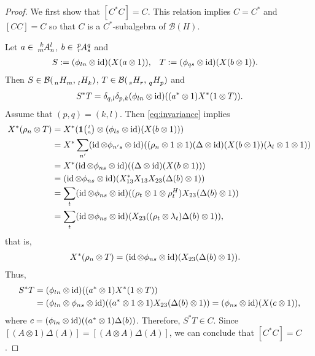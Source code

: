   \begin{proof}
We first show that $[C^{*}C]= C$. This relation implies $C=C^{*}$ and
$[CC]=C$ so that $C$ is a $C^{*}$-subalgebra of $\mathcal{B}(H)$. 

 Let $a\in \Gr{A}{k}{l}{m}{n}$, $b\in \Gr{A}{p}{q}{r}{s}$ and
 \begin{align*}
   S&:=(\phi_{ln} \otimes \operatorname{id})(X(a\otimes 1)), &
   T&:=(\phi_{qs} \otimes \operatorname{id})(X(b\otimes 1)).
 \end{align*}
Then  $S \in \mathcal{B}(\Grd{H}{n}{m},\Grd{H}{l}{k})$, $T\in
\mathcal{B}(\Grd{H}{s}{r},\Grd{H}{q}{p})$ and
\begin{align*}
  S^{*}T = \delta_{q,l}\delta_{p,k} (\phi_{ln} \otimes \operatorname{id})((a^{*}\otimes
  1)X^{*}(1\otimes T)).
\end{align*}
Assume that $(p,q)=(k,l)$.  Then \eqref{eq:invariance} implies
\begin{align*}
 X^{*}(\rho_{n}\otimes T) &=  X^{*}(\mathbf{1}{\tiny {\begin{pmatrix} l\\n\end{pmatrix}}} \otimes (\phi_{ls} \otimes
  \operatorname{id})(X(b\otimes 1))) \\
  &=  X^{*} \sum_{n'}(\operatorname{id} \otimes \phi_{n's}\otimes
  \operatorname{id})((\rho_n\otimes 1\otimes 1)(\Delta\otimes \operatorname{id})(X(b\otimes 1))(\lambda_l\otimes 1 \otimes 1))\\
  &=  X^{*}(\operatorname{id} \otimes \phi_{ns}\otimes
  \operatorname{id})((\Delta\otimes \operatorname{id})(X(b\otimes 1))) \\
  &=    (\operatorname{id} \otimes \phi_{ns}\otimes
  \operatorname{id})(X^{*}_{13}X_{13}X_{23}(\Delta(b)\otimes 1)) \\
  &= \sum_{t}(\operatorname{id} \otimes \phi_{ns} \otimes
  \operatorname{id})((\rho_{t} \otimes 1\otimes \rho^{H}_{t})X_{23}(\Delta(b)\otimes
  1)) \\
&= \sum_{t}(\operatorname{id} \otimes \phi_{ns} \otimes
  \operatorname{id})(X_{23}((\rho_{t}\otimes \lambda_{t})\Delta(b)\otimes
  1)), 
\end{align*}
that is,
\begin{align}\label{eq:corep-complemented}
  X^{*}(\rho_{n}\otimes T) &=
 (\operatorname{id} \otimes \phi_{ns} \otimes
  \operatorname{id})(X_{23}(\Delta(b)\otimes 1)).
\end{align}
Thus,
\begin{align*}
  S^{*}T &= (\phi_{ln} \otimes \operatorname{id})((a^{*}\otimes
  1)X^{*}(1\otimes T))  \\ &= (\phi_{ln} \otimes \phi_{ns} \otimes
  \operatorname{id})((a^{*} \otimes 1\otimes 1)X_{23}(\Delta(b) \otimes 1)) 
  =(\phi_{ns} \otimes \operatorname{id})(X(c\otimes 1)), 
\end{align*}
where $c=(\phi_{ln} \otimes \operatorname{id})((a^{*}\otimes 1)\Delta(b))$. Therefore,
$S^{*}T \in C$. Since $[(A\otimes 1)\Delta(A)]=[(A\otimes
A)\Delta(A)]$, we can conclude that $[C^{*}C]=C$.



\end{proof}
